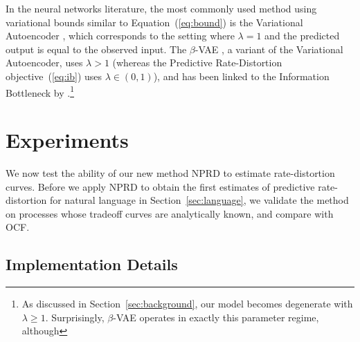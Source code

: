\documentclass[entropy,article,submit,moreauthors,pdftex,10pt,a4paper]{Definitions/mdpi}
\begin{document}
In the neural networks literature, the most commonly used method using variational bounds similar to Equation~(\ref{eq:bound}) is the Variational Autoencoder \citep{kingma-auto-encoding-2014, bowman-generating-2016}, which corresponds to the setting where $\lambda=1$ and the predicted output is equal to the observed input.
The $\beta$-VAE \citep{higgins2017beta}, a variant of the Variational Autoencoder, uses $\lambda > 1$ (whereas the Predictive Rate-Distortion objective~(\ref{eq:ib}) uses $\lambda \in (0,1)$), and has been linked to the Information Bottleneck by \cite{burgess2018understanding}.\footnote{As discussed in Section~\ref{sec:background}, our model becomes degenerate with $\lambda \ge 1$. Surprisingly, $\beta$-VAE operates in exactly this parameter regime, although }





\section{Experiments}\label{sec:experiments}
We now test the ability of our new method NPRD to estimate rate-distortion curves.
Before we apply NPRD to obtain the first estimates of predictive rate-distortion for natural language in Section~\ref{sec:language}, we validate the method on processes whose tradeoff curves are analytically known, and compare with OCF.

\subsection{Implementation Details}
\end{document}
